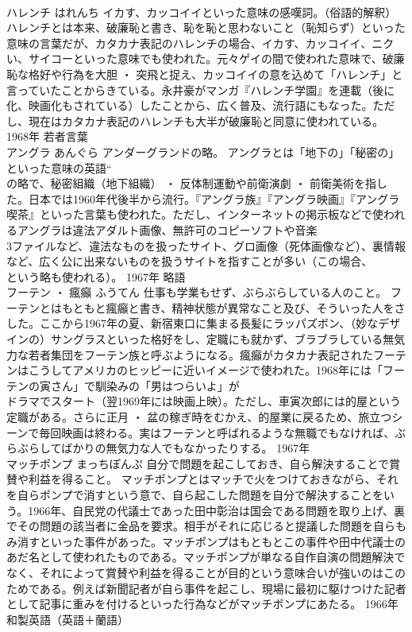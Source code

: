 \documentclass[8pt]{extreport}
\begin{document}
\begin{CJK}{UTF8}{min}
\\	ハレンチ	はれんち	イカす、カッコイイといった意味の感嘆詞。（俗語的解釈）	ハレンチとは本来、破廉恥と書き、恥を恥と思わないこと（恥知らず）といった意味の言葉だが、カタカナ表記のハレンチの場合、イカす、カッコイイ、ニクい、サイコーといった意味でも使われた。元々ゲイの間で使われた意味で、破廉恥な格好や行為を大胆 ・ 突飛と捉え、カッコイイの意を込めて「ハレンチ」と言っていたことからきている。永井豪がマンガ『ハレンチ学園』を連載（後に
\\	化、映画化もされている）したことから、広く普及、流行語にもなった。ただし、現在はカタカナ表記のハレンチも大半が破廉恥と同意に使われている。	1968年	若者言葉	
\\	アングラ	あんぐら	アンダーグランドの略。	アングラとは「地下の」「秘密の」といった意味の英語“
\\	の略で、秘密組織（地下組織） ・ 反体制運動や前衛演劇 ・ 前衛美術を指した。日本では1960年代後半から流行。『アングラ族』『アングラ映画』『アングラ喫茶』といった言葉も使われた。ただし、インターネットの掲示板などで使われるアングラは違法アダルト画像、無許可のコピーソフトや音楽
\\	3ファイルなど、違法なものを扱ったサイト、グロ画像（死体画像など）、裏情報など、広く公に出来ないものを扱うサイトを指すことが多い（この場合、
\\	という略も使われる）。	1967年	略語	
\\	フーテン ・ 瘋癲	ふうてん	仕事も学業もせず、ぶらぶらしている人のこと。	フーテンとはもともと瘋癲と書き、精神状態が異常なこと及び、そういった人をさした。ここから1967年の夏、新宿東口に集まる長髪にラッパズボン、（妙なデザインの）サングラスといった格好をし、定職にも就かず、ブラブラしている無気力な若者集団をフーテン族と呼ぶようになる。瘋癲がカタカナ表記されたフーテンはこうしてアメリカのヒッピーに近いイメージで使われた。1968年には「フーテンの寅さん」で馴染みの「男はつらいよ」が
\\	ドラマでスタート（翌1969年には映画上映）。ただし、車寅次郎には的屋という定職がある。さらに正月 ・ 盆の稼ぎ時をむかえ、的屋業に戻るため、旅立つシーンで毎回映画は終わる。実はフーテンと呼ばれるような無職でもなければ、ぶらぶらしてばかりの無気力な人でもなかったりする。	1967年	
\\	マッチポンプ	まっちぽんぷ	自分で問題を起こしておき、自ら解決することで賞賛や利益を得ること。	マッチポンプとはマッチで火をつけておきながら、それを自らポンプで消すという意で、自ら起こした問題を自分で解決することをいう。1966年、自民党の代議士であった田中彰治は国会である問題を取り上げ、裏でその問題の該当者に金品を要求。相手がそれに応じると提議した問題を自らもみ消すといった事件があった。マッチポンプはもともとこの事件や田中代議士のあだ名として使われたものである。マッチポンプが単なる自作自演の問題解決でなく、それによって賞賛や利益を得ることが目的という意味合いが強いのはこのためである。例えば新聞記者が自ら事件を起こし、現場に最初に駆けつけた記者として記事に重みを付けるといった行為などがマッチポンプにあたる。	1966年	和製英語（英語＋蘭語）	

\end{CJK}
\end{document}
